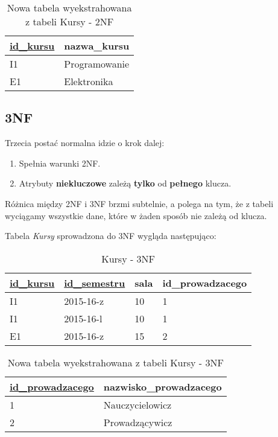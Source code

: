 \begin{table}[H]
\centering
\caption{Nowa tabela wyekstrahowana z tabeli Kursy - 2NF}
\label{my-label}
\begin{tabular}{|l|l|}
\hline
\underline{id\_kursu} & nazwa\_kursu  \\ \hline
I1              & Programowanie \\ \hline
E1              & Elektronika   \\ \hline
\end{tabular}
\end{table}

\subsection*{3NF}
	Trzecia postać normalna idzie o krok dalej:
\begin{enumerate}
	\item{Spełnia warunki 2NF.}
	\item{Atrybuty \textbf{niekluczowe} zależą \textbf{tylko} od \textbf{pełnego} klucza.}
\end{enumerate}

Różnica między 2NF i 3NF brzmi subtelnie, a polega na tym, że z tabeli wyciągamy wszystkie dane, które w żaden sposób nie zależą od klucza.

Tabela \textit{Kursy} sprowadzona do 3NF wygląda następująco:

\begin{table}[H]
\centering
\caption{Kursy - 3NF}
\label{my-label}
\begin{tabular}{|l|l|l|l|}
\hline
\underline{id\_kursu} & \underline{id\_semestru} & sala  & id\_prowadzacego \\ \hline
I1        & 2015-16-z    & 10   & 1                \\ \hline
I1        & 2015-16-l    & 10   & 1                \\ \hline
E1        & 2015-16-z    & 15   & 2                \\ \hline
\end{tabular}
\end{table}

\begin{table}[H]
\centering
\caption{Nowa tabela wyekstrahowana z tabeli Kursy - 3NF}
\label{my-label}
\begin{tabular}{|l|l|}
\hline
\underline{id\_prowadzacego} & nazwisko\_prowadzacego  \\ \hline
1              & Nauczycielowicz \\ \hline
2              & Prowadzącywicz   \\ \hline
\end{tabular}
\end{table}